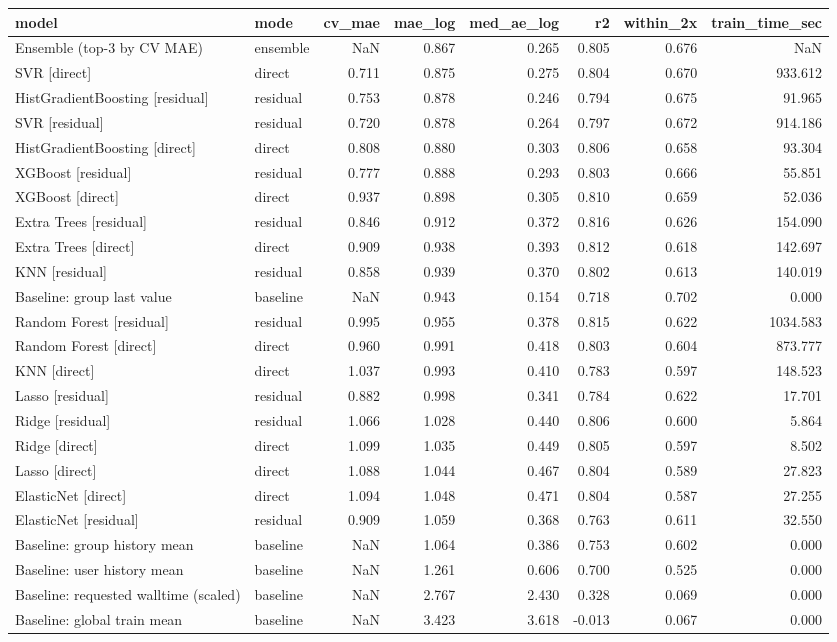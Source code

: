 \begin{tabular}{llrrrrrr}
\toprule
model & mode & cv_mae & mae_log & med_ae_log & r2 & within_2x & train_time_sec \\
\midrule
Ensemble (top-3 by CV MAE) & ensemble & NaN & 0.867 & 0.265 & 0.805 & 0.676 & NaN \\
SVR [direct] & direct & 0.711 & 0.875 & 0.275 & 0.804 & 0.670 & 933.612 \\
HistGradientBoosting [residual] & residual & 0.753 & 0.878 & 0.246 & 0.794 & 0.675 & 91.965 \\
SVR [residual] & residual & 0.720 & 0.878 & 0.264 & 0.797 & 0.672 & 914.186 \\
HistGradientBoosting [direct] & direct & 0.808 & 0.880 & 0.303 & 0.806 & 0.658 & 93.304 \\
XGBoost [residual] & residual & 0.777 & 0.888 & 0.293 & 0.803 & 0.666 & 55.851 \\
XGBoost [direct] & direct & 0.937 & 0.898 & 0.305 & 0.810 & 0.659 & 52.036 \\
Extra Trees [residual] & residual & 0.846 & 0.912 & 0.372 & 0.816 & 0.626 & 154.090 \\
Extra Trees [direct] & direct & 0.909 & 0.938 & 0.393 & 0.812 & 0.618 & 142.697 \\
KNN [residual] & residual & 0.858 & 0.939 & 0.370 & 0.802 & 0.613 & 140.019 \\
Baseline: group last value & baseline & NaN & 0.943 & 0.154 & 0.718 & 0.702 & 0.000 \\
Random Forest [residual] & residual & 0.995 & 0.955 & 0.378 & 0.815 & 0.622 & 1034.583 \\
Random Forest [direct] & direct & 0.960 & 0.991 & 0.418 & 0.803 & 0.604 & 873.777 \\
KNN [direct] & direct & 1.037 & 0.993 & 0.410 & 0.783 & 0.597 & 148.523 \\
Lasso [residual] & residual & 0.882 & 0.998 & 0.341 & 0.784 & 0.622 & 17.701 \\
Ridge [residual] & residual & 1.066 & 1.028 & 0.440 & 0.806 & 0.600 & 5.864 \\
Ridge [direct] & direct & 1.099 & 1.035 & 0.449 & 0.805 & 0.597 & 8.502 \\
Lasso [direct] & direct & 1.088 & 1.044 & 0.467 & 0.804 & 0.589 & 27.823 \\
ElasticNet [direct] & direct & 1.094 & 1.048 & 0.471 & 0.804 & 0.587 & 27.255 \\
ElasticNet [residual] & residual & 0.909 & 1.059 & 0.368 & 0.763 & 0.611 & 32.550 \\
Baseline: group history mean & baseline & NaN & 1.064 & 0.386 & 0.753 & 0.602 & 0.000 \\
Baseline: user history mean & baseline & NaN & 1.261 & 0.606 & 0.700 & 0.525 & 0.000 \\
Baseline: requested walltime (scaled) & baseline & NaN & 2.767 & 2.430 & 0.328 & 0.069 & 0.000 \\
Baseline: global train mean & baseline & NaN & 3.423 & 3.618 & -0.013 & 0.067 & 0.000 \\
\bottomrule
\end{tabular}
